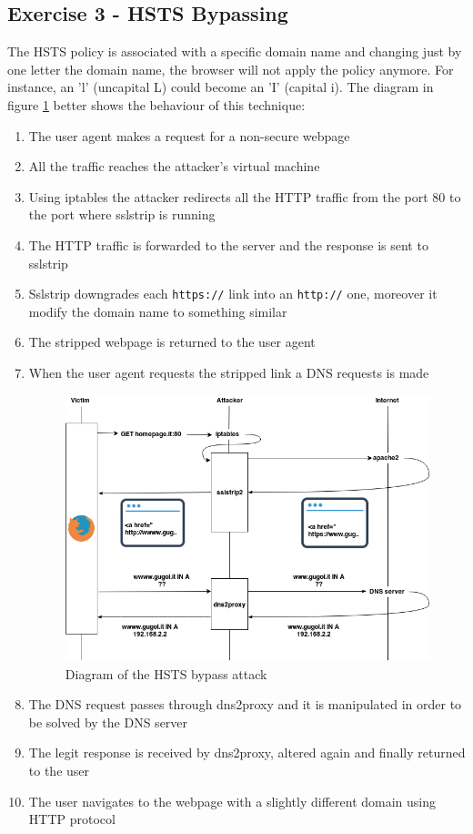 \documentclass[final]{article}
\begin{document}
\subsection{Exercise 3 - HSTS Bypassing}
The HSTS policy is associated with a specific domain name and changing just by one letter the domain name, the browser will
not apply the policy anymore. For instance, an ’l’ (uncapital L) could become an ’I’ (capital i).
The diagram in figure \ref{hsts_bypass} better shows the behaviour of this technique:
\begin{enumerate}
  \item The user agent makes a request for a non-secure webpage
  \item All the traffic reaches the attacker's virtual machine
  \item Using iptables the attacker redirects all the HTTP traffic from the port 80 to the port where sslstrip is running
  \item The HTTP traffic is forwarded to the server and the response is sent to sslstrip
  \item Sslstrip downgrades each \texttt{https://} link into an \texttt{http://} one, moreover it modify the domain name to something similar
  \item The stripped webpage is returned to the user agent
  \item When the user agent requests the stripped link a DNS requests is made
  \begin{figure}[h]
    \center
    \includegraphics[width=\textwidth]{../figures/hsts_bypass_time}
    \caption{Diagram of the HSTS bypass attack}
    \label{hsts_bypass}
  \end{figure}
  \item The DNS request passes through dns2proxy and it is manipulated in order to be solved by the DNS server
  \item The legit response is received by dns2proxy, altered again and finally returned to the user
  \item The user navigates to the webpage with a slightly different domain using HTTP protocol
\end{enumerate}
\end{document}
